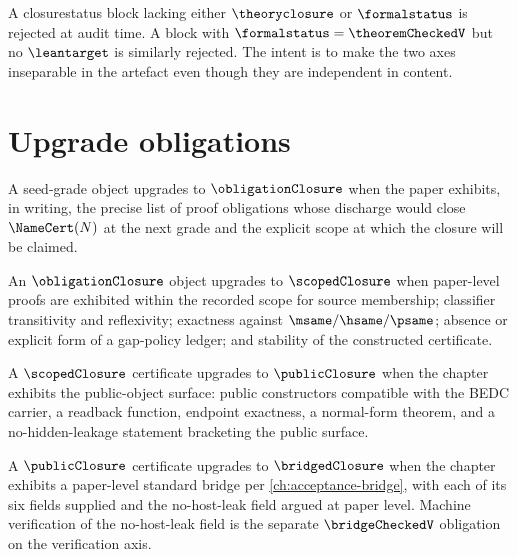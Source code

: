 \begin{remark}
\label{rem:closurestatus-both-axes}
A closurestatus block lacking either $\theoryclosure$ or $\formalstatus$ is rejected at audit time. A block with $\formalstatus = \theoremCheckedV$ but no $\leantarget$ is similarly rejected. The intent is to make the two axes inseparable in the artefact even though they are independent in content.
\end{remark}

\section{Upgrade obligations}
\label{sec:closure-upgrade-obligations}

\begin{definition}
\label{def:upgrade-seed-to-obligation}
A seed-grade object upgrades to $\obligationClosure$ when the paper exhibits, in writing, the precise list of proof obligations whose discharge would close $\NameCert(N)$ at the next grade and the explicit scope at which the closure will be claimed.
\end{definition}

\begin{definition}
\label{def:upgrade-obligation-to-scoped}
An $\obligationClosure$ object upgrades to $\scopedClosure$ when paper-level proofs are exhibited within the recorded scope for source membership; classifier transitivity and reflexivity; exactness against $\msame / \hsame / \psame$; absence or explicit form of a gap-policy ledger; and stability of the constructed certificate.
\end{definition}

\begin{definition}
\label{def:upgrade-scoped-to-public}
A $\scopedClosure$ certificate upgrades to $\publicClosure$ when the chapter exhibits the public-object surface: public constructors compatible with the BEDC carrier, a readback function, endpoint exactness, a normal-form theorem, and a no-hidden-leakage statement bracketing the public surface.
\end{definition}

\begin{definition}
\label{def:upgrade-public-to-bridged}
A $\publicClosure$ certificate upgrades to $\bridgedClosure$ when the chapter exhibits a paper-level standard bridge per \autoref{ch:acceptance-bridge}, with each of its six fields supplied and the no-host-leak field argued at paper level. Machine verification of the no-host-leak field is the separate $\bridgeCheckedV$ obligation on the verification axis.
\end{definition}

